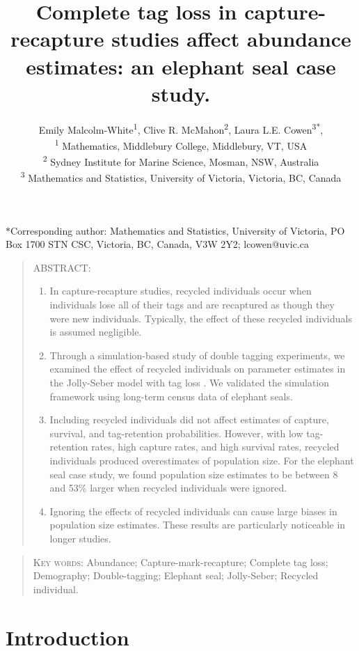 \documentclass[12pt]{article}
\date{}
\title{Complete tag loss in capture-recapture studies affect abundance estimates: an elephant seal case study.}
\author{Emily Malcolm-White\textsuperscript{1},
        Clive R. McMahon\textsuperscript{2}, 
        Laura L.E. Cowen\textsuperscript{3*}, 
        \\ 
        \textsuperscript{1} Mathematics\DIFdelbegin \DIFdel{and Statistics}\DIFdelend , Middlebury College, Middlebury, VT, USA\\ 
        \textsuperscript{2} Sydney Institute for Marine Science, Mosman, NSW, Australia\\
       \textsuperscript{3} Mathematics and Statistics, University of Victoria, Victoria, BC, Canada}
\begin{document}
\maketitle

$*$Corresponding author: Mathematics and Statistics, University of Victoria,
       PO Box 1700 STN CSC, Victoria, BC, Canada, V3W 2Y2; lcowen@uvic.ca
\newpage

\begin{quote}
\textsc{ABSTRACT:} 
\begin{enumerate}
	\item In capture-recapture studies, recycled individuals occur
when individuals lose all of their tags and are recaptured as though they were new
individuals. Typically, the effect of these recycled individuals is
assumed negligible. 

	\item Through a simulation-based study of double tagging experiments, we examined the
effect of recycled individuals on parameter estimates in the
Jolly-Seber model with tag loss \citep{Cowen:2006}. We validated the simulation
framework using long-term census data of elephant seals.

	\item  Including recycled individuals did not affect estimates of capture, survival, and tag-retention probabilities. However, with low tag-retention
rates, high capture rates, and high survival rates, recycled individuals produced overestimates of population size. For the elephant seal case study, we found population size estimates to be between 8 and 53\% larger when recycled individuals were ignored. 

	\item Ignoring the effects of recycled individuals can cause large biases in population size estimates. These results are particularly noticeable in longer studies.
	\end{enumerate} 
\end{quote}

\begin{quote}
\begin{center} \textsc{Key words:} Abundance; Capture-mark-recapture; Complete tag loss;  Demography; Double-tagging; Elephant seal; Jolly-Seber; Recycled individual. 
\end{center}
\end{quote}



\section{Introduction}\label{introduction}
\end{document}
